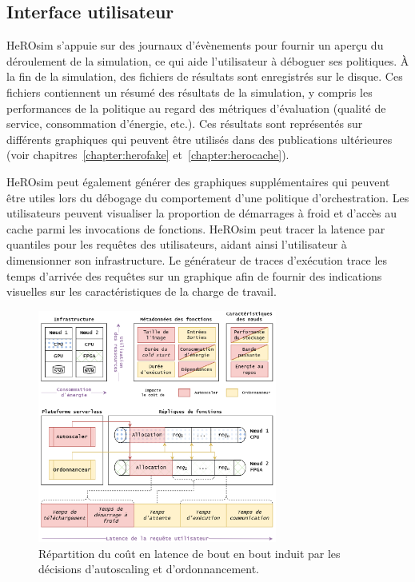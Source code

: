 \subsection{Interface utilisateur}

HeROsim s'appuie sur des journaux d'évènements pour fournir un aperçu du déroulement de la simulation, ce qui aide l'utilisateur à déboguer ses politiques. À la fin de la simulation, des fichiers de résultats sont enregistrés sur le disque. Ces fichiers contiennent un résumé des résultats de la simulation, y compris les performances de la politique au regard des métriques d'évaluation (qualité de service, consommation d'énergie, etc.). Ces résultats sont représentés sur différents graphiques qui peuvent être utilisés dans des publications ultérieures (voir chapitres~\ref{chapter:herofake} et~\ref{chapter:herocache}).

HeROsim peut également générer des graphiques supplémentaires qui peuvent être utiles lors du débogage du comportement d'une politique d'orchestration. Les utilisateurs peuvent visualiser la proportion de démarrages à froid et d'accès au cache parmi les invocations de fonctions. HeROsim peut tracer la latence par quantiles pour les requêtes des utilisateurs, aidant ainsi l'utilisateur à dimensionner son infrastructure. Le générateur de traces d'exécution trace les temps d'arrivée des requêtes sur un graphique afin de fournir des indications visuelles sur les caractéristiques de la charge de travail.

\begin{figure}[!ht]
    \centering
    \includegraphics[width=0.7\textwidth]{6_Chapitre6/figures/serverless-cost.png}
    \caption{Répartition du coût en latence de bout en bout induit par les décisions d'autoscaling et d'ordonnancement.}
\label{figure:herosim-cost}
\end{figure}

